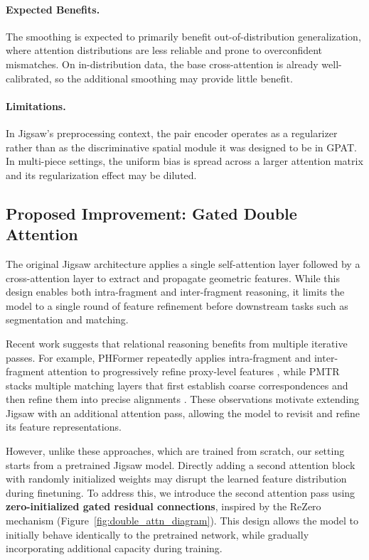 \paragraph{Expected Benefits.}
The smoothing is expected to primarily benefit out-of-distribution generalization, where attention distributions are less reliable and prone to overconfident mismatches. On in-distribution data, the base cross-attention is already well-calibrated, so the additional smoothing may provide little benefit.

\paragraph{Limitations.}
In Jigsaw's preprocessing context, the pair encoder operates as a regularizer rather than as the discriminative spatial module it was designed to be in GPAT. In multi-piece settings, the uniform bias is spread across a larger attention matrix and its regularization effect may be diluted.

\subsection{Proposed Improvement: Gated Double Attention}
\label{sec:double_attn_method}

The original Jigsaw architecture applies a single self-attention layer followed by a cross-attention layer to extract and propagate geometric features. While this design enables both intra-fragment and inter-fragment reasoning, it limits the model to a single round of feature refinement before downstream tasks such as segmentation and matching.

Recent work suggests that relational reasoning benefits from multiple iterative passes. For example, PHFormer repeatedly applies intra-fragment and inter-fragment attention to progressively refine proxy-level features \cite{cui2024phformer}, while PMTR stacks multiple matching layers that first establish coarse correspondences and then refine them into precise alignments \cite{lee20243d}. These observations motivate extending Jigsaw with an additional attention pass, allowing the model to revisit and refine its feature representations.

However, unlike these approaches, which are trained from scratch, our setting starts from a pretrained Jigsaw model. Directly adding a second attention block with randomly initialized weights may disrupt the learned feature distribution during finetuning. To address this, we introduce the second attention pass using \textbf{zero-initialized gated residual connections}, inspired by the ReZero mechanism \cite{bachlechner_rezero} (Figure~\ref{fig:double_attn_diagram}). This design allows the model to initially behave identically to the pretrained network, while gradually incorporating additional capacity during training.

